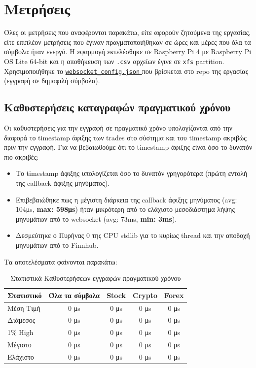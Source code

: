 \documentclass[12pt]{article}
\newcommand{\config}{\href{https://github.com/Selivanof/university-collection/tree/main/RealTime_Embedded_Systems/measurements/websocket_config.json}{\texttt{websocket\_config.json} }}
\begin{document}
\section{Μετρήσεις}
Όλες οι μετρήσεις που αναφέρονται παρακάτω, είτε αφορούν ζητούμενα της εργασίας, είτε επιπλέον μετρήσεις που έγιναν πραγματοποιήθηκαν σε ώρες και μέρες που όλα τα σύμβολα ήταν ενεργά. Η εφαρμογή εκτελέσθηκε σε Raspberry Pi 4 με Raspberry Pi OS Lite 64-bit και η αποθήκευση των \texttt{.csv} αρχείων έγινε σε  \texttt{xfs} partition. Χρησιμοποιήθηκε το \config που βρίσκεται στο repo της εργασίας (εγγραφή σε δημοφιλή σύμβολα).

\subsection{Καθυστερήσεις καταγραφών πραγματικού χρόνου}
Οι καθυστερήσεις για την εγγραφή σε πραγματικό χρόνο υπολογίζονται από την διαφορά το timestamp άφιξης των trades στο σύστημα και του timestamp ακριβώς πριν την εγγραφή. Για να βεβαιωθούμε ότι το timestamp άφιξης είναι όσο το δυνατόν πιο ακριβές:
\begin{itemize}
    \item Το timestamp άφιξης υπολογίζεται όσο το δυνατόν γρηγορότερα (πρώτη εντολή της callback άφιξης μηνύματος).
    \item Επιβεβαιώθηκε πως η μέγιστη διάρκεια της callback άφιξης μηνύματος  (avg: 104μs, \textbf{max: 598μs}) ήταν μικρότερη από το ελάχιστο μεσοδιάστημα λήψης μηνυμάτων από το websocket (avg: 73ms, \textbf{min: 3ms}).
        \item Δεσμεύτηκε ο Πυρήνας 0 της CPU stdlib για το κυρίως thread και την αποδοχή μηνυμάτων από το Finnhub.
\end{itemize}
Τα αποτελέσματα φαίνονται παρακάτω:


\begin{table}[H]
    \centering
    \begin{tabular}{lcccc}
        \textbf{Στατιστικό} & \textbf{Όλα τα σύμβολα} & \textbf{Stock} & \textbf{Crypto} & \textbf{Forex} \\
        \hline
        Μέση Τιμή     & 0 μs & 0 μs & 0 μs & 0 μs   \\
        Διάμεσος  & 0 μs & 0 μs & 0 μs & 0 μs  \\
        1\% High & 0 μs & 0 μs & 0 μs & 0 μs  \\
        Μέγιστο      & 0 μs & 0 μs & 0 μs  & 0 μs \\
        Ελάχιστο      & 0 μs & 0 μs & 0 μs & 0 μs  \\
    \end{tabular}
    \caption{Στατιστικά Καθυστερήσεων εγγραφών πραγματικού χρόνου}
    \label{tab:realtime_stats}
\end{table}
\end{document}
